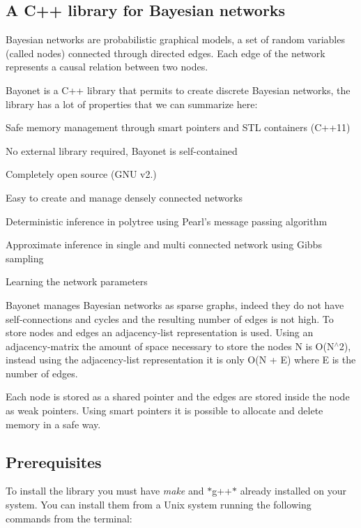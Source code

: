 \subsection*{A C++ library for Bayesian networks }

Bayesian networks are probabilistic graphical models, a set of random variables (called nodes) connected through directed edges. Each edge of the network represents a causal relation between two nodes.

Bayonet is a C++ library that permits to create discrete Bayesian networks, the library has a lot of properties that we can summarize here\-:


\begin{DoxyItemize}
\item Safe memory management through smart pointers and S\-T\-L containers (C++11)
\item No external library required, Bayonet is self-\/contained
\item Completely open source (G\-N\-U v2.)
\item Easy to create and manage densely connected networks
\item Deterministic inference in polytree using Pearl's message passing algorithm
\item Approximate inference in single and multi connected network using Gibbs sampling
\item Learning the network parameters
\end{DoxyItemize}

Bayonet manages Bayesian networks as sparse graphs, indeed they do not have self-\/connections and cycles and the resulting number of edges is not high. To store nodes and edges an adjacency-\/list representation is used. Using an adjacency-\/matrix the amount of space necessary to store the nodes N is O(\-N$^\wedge$2), instead using the adjacency-\/list representation it is only O(N + E) where E is the number of edges.

Each node is stored as a shared pointer and the edges are stored inside the node as weak pointers. Using smart pointers it is possible to allocate and delete memory in a safe way.

\subsection*{Prerequisites }

To install the library you must have {\itshape make} and $\ast$g++$\ast$ already installed on your system. You can install them from a Unix system running the following commands from the terminal\-:

